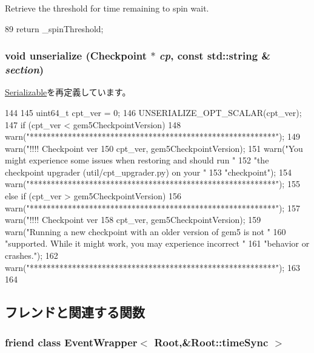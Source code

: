 Retrieve the threshold for time remaining to spin wait. 


\begin{DoxyCode}
89 { return _spinThreshold; }
\end{DoxyCode}
\hypertarget{classRoot_af22e5d6d660b97db37003ac61ac4ee49}{
\subsubsection[{unserialize}]{\setlength{\rightskip}{0pt plus 5cm}void unserialize ({\bf Checkpoint} $\ast$ {\em cp}, \/  const std::string \& {\em section})}}
\label{classRoot_af22e5d6d660b97db37003ac61ac4ee49}


\hyperlink{classSerializable_af100c4e9feabf3cd918619c88c718387}{Serializable}を再定義しています。


\begin{DoxyCode}
144 {
145     uint64_t cpt_ver = 0;
146     UNSERIALIZE_OPT_SCALAR(cpt_ver);
147     if (cpt_ver < gem5CheckpointVersion) {
148         warn("**********************************************************\n");
149         warn("!!!! Checkpoint ver %
150                 cpt_ver, gem5CheckpointVersion);
151         warn("You might experience some issues when restoring and should run "
152              "the checkpoint upgrader (util/cpt_upgrader.py) on your "
153              "checkpoint\n");
154         warn("**********************************************************\n");
155     } else if (cpt_ver > gem5CheckpointVersion) {
156         warn("**********************************************************\n");
157         warn("!!!! Checkpoint ver %
158                 cpt_ver, gem5CheckpointVersion);
159         warn("Running a new checkpoint with an older version of gem5 is not "
160              "supported. While it might work, you may experience incorrect "
161              "behavior or crashes.\n");
162         warn("**********************************************************\n");
163      }
164 }
\end{DoxyCode}


\subsection{フレンドと関連する関数}
\hypertarget{classRoot_a47a21fa8d012ff7d9657be29b3e52ee1}{
\subsubsection[{EventWrapper$<$ Root,\&Root::timeSync $>$}]{\setlength{\rightskip}{0pt plus 5cm}friend class {\bf EventWrapper}$<$ {\bf Root},\&Root::timeSync $>$}}
\label{classRoot_a47a21fa8d012ff7d9657be29b3e52ee1}


